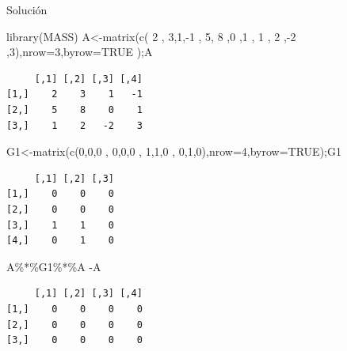 \documentclass[
  ignorenonframetext,
  aspectratio=169,
  spanish,
]{beamer}
\newenvironment{Shaded}{\begin{snugshade}}{\end{snugshade}}
\newcommand{\AttributeTok}[1]{\textcolor[rgb]{0.40,0.45,0.13}{#1}}
\newcommand{\ConstantTok}[1]{\textcolor[rgb]{0.56,0.35,0.01}{#1}}
\newcommand{\DecValTok}[1]{\textcolor[rgb]{0.68,0.00,0.00}{#1}}
\newcommand{\FunctionTok}[1]{\textcolor[rgb]{0.28,0.35,0.67}{#1}}
\newcommand{\NormalTok}[1]{\textcolor[rgb]{0.00,0.23,0.31}{#1}}
\newcommand{\OtherTok}[1]{\textcolor[rgb]{0.00,0.23,0.31}{#1}}
\newcommand{\SpecialCharTok}[1]{\textcolor[rgb]{0.37,0.37,0.37}{#1}}
\begin{document}
\begin{frame}[fragile]{Solución}
\label{soluciuxf3n-2}
\begin{Shaded}
\begin{Highlighting}[]
\FunctionTok{library}\NormalTok{(MASS)}
\NormalTok{A}\OtherTok{\textless{}{-}}\FunctionTok{matrix}\NormalTok{(}\FunctionTok{c}\NormalTok{( }\DecValTok{2}\NormalTok{ , }\DecValTok{3}\NormalTok{,}\DecValTok{1}\NormalTok{,}\SpecialCharTok{{-}}\DecValTok{1}\NormalTok{ ,}
    \DecValTok{5}\NormalTok{, }\DecValTok{8}\NormalTok{ ,}\DecValTok{0}\NormalTok{ ,}\DecValTok{1}\NormalTok{ ,}
    \DecValTok{1}\NormalTok{ , }\DecValTok{2}\NormalTok{ ,}\SpecialCharTok{{-}}\DecValTok{2}\NormalTok{ ,}\DecValTok{3}\NormalTok{),}\AttributeTok{nrow=}\DecValTok{3}\NormalTok{,}\AttributeTok{byrow=}\ConstantTok{TRUE}\NormalTok{ );A}
\end{Highlighting}
\end{Shaded}

\begin{verbatim}
     [,1] [,2] [,3] [,4]
[1,]    2    3    1   -1
[2,]    5    8    0    1
[3,]    1    2   -2    3
\end{verbatim}

\begin{Shaded}
\begin{Highlighting}[]
\NormalTok{G1}\OtherTok{\textless{}{-}}\FunctionTok{matrix}\NormalTok{(}\FunctionTok{c}\NormalTok{(}\DecValTok{0}\NormalTok{,}\DecValTok{0}\NormalTok{,}\DecValTok{0}\NormalTok{ ,}
    \DecValTok{0}\NormalTok{,}\DecValTok{0}\NormalTok{,}\DecValTok{0}\NormalTok{ ,}
    \DecValTok{1}\NormalTok{,}\DecValTok{1}\NormalTok{,}\DecValTok{0}\NormalTok{ ,}
    \DecValTok{0}\NormalTok{,}\DecValTok{1}\NormalTok{,}\DecValTok{0}\NormalTok{),}\AttributeTok{nrow=}\DecValTok{4}\NormalTok{,}\AttributeTok{byrow=}\ConstantTok{TRUE}\NormalTok{);G1}
\end{Highlighting}
\end{Shaded}

\begin{verbatim}
     [,1] [,2] [,3]
[1,]    0    0    0
[2,]    0    0    0
[3,]    1    1    0
[4,]    0    1    0
\end{verbatim}

\begin{Shaded}
\begin{Highlighting}[]
\NormalTok{A}\SpecialCharTok{\%*\%}\NormalTok{G1}\SpecialCharTok{\%*\%}\NormalTok{A }\SpecialCharTok{{-}}\NormalTok{A}
\end{Highlighting}
\end{Shaded}

\begin{verbatim}
     [,1] [,2] [,3] [,4]
[1,]    0    0    0    0
[2,]    0    0    0    0
[3,]    0    0    0    0
\end{verbatim}
\end{frame}
\end{document}

